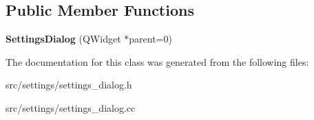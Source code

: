 \subsection*{Public Member Functions}
\begin{DoxyCompactItemize}
\item 
{\bfseries Settings\+Dialog} (Q\+Widget $\ast$parent=0)\hypertarget{classsettings_1_1SettingsDialog_a0e266ab99080f1a78bcfe8617c247040}{}\label{classsettings_1_1SettingsDialog_a0e266ab99080f1a78bcfe8617c247040}

\end{DoxyCompactItemize}


The documentation for this class was generated from the following files\+:\begin{DoxyCompactItemize}
\item 
src/settings/settings\+\_\+dialog.\+h\item 
src/settings/settings\+\_\+dialog.\+cc\end{DoxyCompactItemize}
